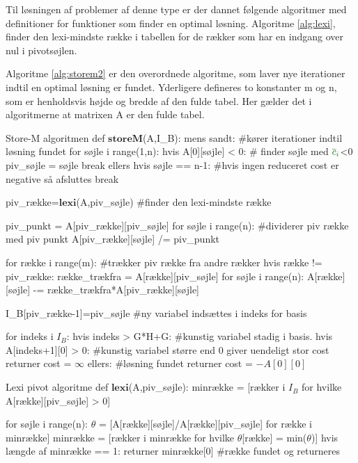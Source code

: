 Til løsningen af problemer af denne type er der dannet følgende algoritmer med definitioner for funktioner som finder en optimal løsning. Algoritme \ref{alg:lexi}, finder den lexi-mindste række i tabellen for de rækker som har en indgang over nul i pivotsøjlen. 

Algoritme \ref{alg:storem2} er den overordnede algoritme, som laver nye iterationer indtil en optimal løsning er fundet. Yderligere defineres to konstanter m og n, som er henholdsvis højde og bredde af den fulde tabel. Her gælder det i algoritmerne at matrixen A er den fulde tabel.

\newpage

\begin{alg}[label={alg:storem2}]{Store-M algoritmen}
def $\textbf{storeM}$(A,I_B):
    mens sandt: #kører iterationer indtil løsning fundet
    	for søjle i range(1,n): 
        	hvis A[0][søjle] < 0: # finder søjle med ${\color{commentgreen} \overline{c}_i}$<0
            	piv_søjle = søjle
            	break
        	ellers hvis søjle == n-1: #hvis ingen reduceret cost er negative så afsluttes
				break
            
    	piv_række=$\textbf{lexi}$(A,piv_søjle) #finder den lexi-mindste række
            
    	piv_punkt = A[piv_række][piv_søjle] 
    	for søjle i range(n): #dividerer piv række med piv punkt
        	A[piv_række][søjle] /= piv_punkt
            
    	for række i range(m): #trækker piv række fra andre rækker
        	hvis række != piv_række:
            	række_trækfra = A[række][piv_søjle]
            	for søjle i range(n):
                	A[række][søjle] -= række_trækfra*A[piv_række][søjle]

    	I_B[piv_række-1]=piv_søjle #ny variabel indsættes i indeks for basis

	for indeks i $I_B$: 
		hvis indeks > G*H+G: #kunstig variabel stadig i basis. 
			hvis A[indeks+1][0] > 0: #kunstig variabel større end 0 giver uendeligt stor cost
				returner cost = $\infty$
	ellers: #løsning fundet
		returner cost = $-A[0][0]$
\end{alg}

\begin{alg}[label={alg:lexi}]{Lexi pivot algoritme}
def $\textbf{lexi}$(A,piv_søjle):
	minrække = [rækker i $I_B$ for hvilke A[række][piv_søjle] > 0]
	
	for søjle i range(n):
		$\theta$ = [A[række][søjle]/A[række][piv_søjle] for række i minrække]
		minrække = [rækker i minrække for hvilke $\theta$[række] = min($\theta$)]
		hvis længde af minrække == 1:
			returner minrække[0] #række fundet og returneres
\end{alg}




